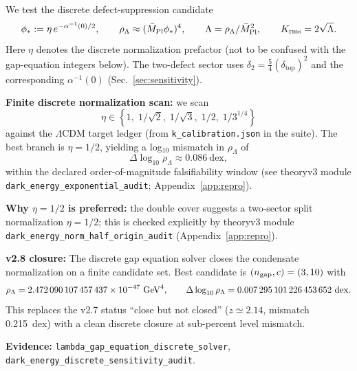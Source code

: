 \begin{tcolorbox}[colback=gray!5, colframe=gray!60,
title={\textbf{Closure-level candidate: discrete $\rho_\Lambda$ with no continuous knobs}}, fonttitle=\bfseries\small]
We test the discrete defect-suppression candidate
\[
\phi_\ast := \eta\,e^{-\alpha^{-1}(0)/2},
\qquad
\rho_\Lambda \approx (\bar{M}_{\mathrm{Pl}} \phi_\ast)^4,
\qquad
\Lambda=\rho_\Lambda/\bar{M}_{\mathrm{Pl}}^2,
\qquad
K_{\mathrm{rms}}=2\sqrt{\Lambda}.
\]
Here $\eta$ denotes the discrete normalization prefactor (not to be confused with the gap-equation integers below).
The two-defect sector uses $\delta_2=\tfrac54(\delta_{\mathrm{top}})^2$ and the corresponding $\alpha^{-1}(0)$ (Sec.~\ref{sec:sensitivity}).

\textbf{Finite discrete normalization scan:} we scan
\[
\eta\in\left\{1,\;1/\sqrt{2},\;1/\sqrt{3},\;1/2,\;1/3^{1/4}\right\}
\]
against the $\Lambda$CDM target ledger (from \texttt{k\_calibration.json} in the suite).
The best branch is $\eta=1/2$, yielding a log$_{10}$ mismatch in $\rho_\Lambda$ of
\[
\Delta\log_{10}\rho_\Lambda \approx 0.086~\text{dex},
\]
within the declared order-of-magnitude falsifiability window (see theoryv3 module \texttt{dark\_energy\_exponential\_audit}; Appendix~\ref{app:repro}).

\textbf{Why $\eta=1/2$ is preferred:} the double cover suggests a two-sector split normalization $\eta=1/2$; this is checked explicitly by theoryv3 module \texttt{dark\_energy\_norm\_half\_origin\_audit} (Appendix~\ref{app:repro}).

\textbf{v2.8 closure:} The discrete gap equation solver closes the condensate normalization on a finite candidate set.
Best candidate is $(n_{\mathrm{gap}},c)=(3,10)$ with
\[
\rho_\Lambda=\num{\TFPTrhoLambdaPred}\ \mathrm{GeV}^4,
\qquad
\Delta\log_{10}\rho_\Lambda=\num{\TFPTrhoLambdaLogMismatch}\ \mathrm{dex}.
\]
This replaces the v2.7 status ``close but not closed'' ($z\simeq 2.14$, mismatch 0.215~dex) with a clean discrete closure at sub-percent level mismatch.

\textbf{Evidence:} \texttt{lambda\_gap\_equation\_discrete\_solver}, \texttt{dark\_energy\_discrete\_sensitivity\_audit}.
\end{tcolorbox}

